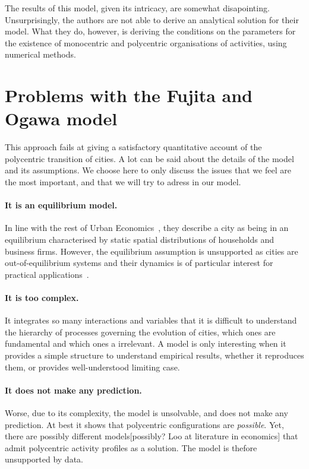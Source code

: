The results of this model, given its intricacy, are somewhat disapointing.
Unsurprisingly, the authors are not able to derive an analytical solution for
their model. What they do, however, is deriving the conditions on the parameters
for the existence of monocentric and polycentric organisations of activities,
using numerical methods.

\section{Problems with the Fujita and Ogawa model}
\label{sec:problems_with_the_fujita_and_ogawa_model}

This approach fails at giving a satisfactory quantitative account  of the
polycentric transition of cities. A lot can be said about the details of the
model and its assumptions. We choose here to only discuss the issues that we
feel are the most important, and that we will try to adress in our model. 

\paragraph{It is an equilibrium model.} In line with the rest of Urban
Economics~\cite{Fujita:2001, Fujita:2013}, they describe a city as being in
an equilibrium characterised by static spatial distributions of households and
business firms. However, the equilibrium assumption is unsupported as cities are
out-of-equilibrium systems and their dynamics is of particular interest for
practical applications~\cite{Batty:2008}.\\

\paragraph{It is too complex.} It integrates so many interactions and
variables that it is difficult to understand the hierarchy of processes
governing the evolution of cities, which ones are fundamental and which ones a
irrelevant. A model is only interesting when it
provides a simple structure to understand empirical results, whether it
reproduces them, or provides well-understood limiting case. 

\paragraph{It does not make any prediction.} Worse, due to its complexity, the
model is unsolvable, and does not make any prediction. At best it shows that
polycentric configurations are \emph{possible}. Yet, there are possibly different
models[possibly? Loo
at literature in economics] that admit polycentric activity profiles as a
solution. The model is thefore unsupported by data.\\ 

